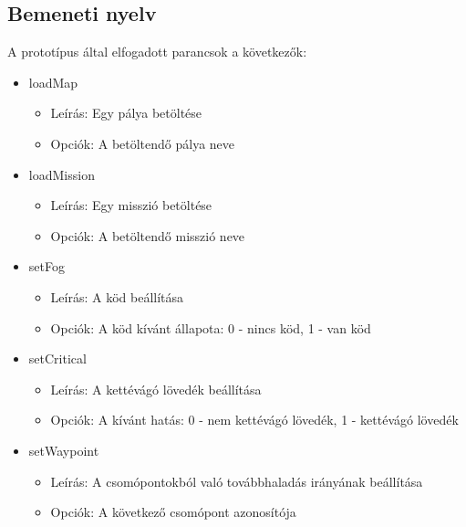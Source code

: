 \subsection{Bemeneti nyelv}

A prototípus által elfogadott parancsok a következők:

\begin{itemize}

\item loadMap
	\begin{itemize}
	\item Leírás: Egy pálya betöltése
	\item Opciók: A betöltendő pálya neve
	\end{itemize}

\item loadMission
	\begin{itemize}
	\item Leírás: Egy misszió betöltése
	\item Opciók: A betöltendő misszió neve
	\end{itemize}

\item setFog
	\begin{itemize}
	\item Leírás: A köd beállítása
	\item Opciók: A köd kívánt állapota: 0 - nincs köd, 1 - van köd
	\end{itemize}

\item setCritical
	\begin{itemize}
	\item Leírás: A kettévágó lövedék beállítása
	\item Opciók: A kívánt hatás: 0 - nem kettévágó lövedék, 1 - kettévágó lövedék
	\end{itemize}

\item setWaypoint
	\begin{itemize}
	\item Leírás: A csomópontokból való továbbhaladás irányának beállítása
	\item Opciók: A következő csomópont azonosítója
	\end{itemize}


\end{itemize}
